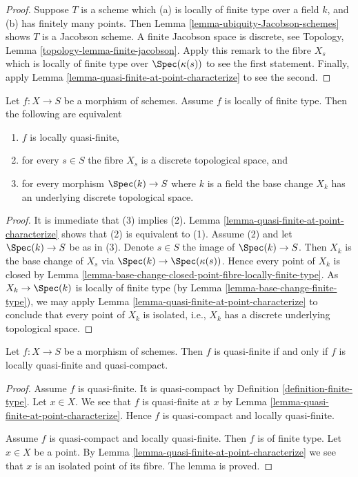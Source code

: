 \begin{proof}
Suppose $T$ is a scheme which (a) is locally of finite type
over a field $k$, and (b) has finitely many points. Then
Lemma \ref{lemma-ubiquity-Jacobson-schemes} shows $T$ is a
Jacobson scheme. A finite Jacobson space is discrete, see
Topology, Lemma \ref{topology-lemma-finite-jacobson}.
Apply this remark to the fibre $X_s$ which is locally of finite type over
$\Spec(\kappa(s))$ to see the first statement. Finally, apply
Lemma \ref{lemma-quasi-finite-at-point-characterize} to see the second.
\end{proof}

\begin{lemma}
\label{lemma-locally-quasi-finite-fibres}
Let $f : X \to S$ be a morphism of schemes.
Assume $f$ is locally of finite type.
Then the following are equivalent
\begin{enumerate}
\item $f$ is locally quasi-finite,
\item for every $s \in S$ the fibre $X_s$ is a discrete topological space, and
\item for every morphism $\Spec(k) \to S$ where $k$ is a field
the base change $X_k$ has an underlying discrete topological space.
\end{enumerate}
\end{lemma}

\begin{proof}
It is immediate that (3) implies (2).
Lemma \ref{lemma-quasi-finite-at-point-characterize}
shows that (2) is equivalent to (1).
Assume (2) and let $\Spec(k) \to S$ be as in (3).
Denote $s \in S$ the image  of $\Spec(k) \to S$.
Then $X_k$ is the base change of $X_s$ via
$\Spec(k) \to \Spec(\kappa(s))$. Hence every
point of $X_k$ is closed by
Lemma \ref{lemma-base-change-closed-point-fibre-locally-finite-type}.
As $X_k \to \Spec(k)$ is locally of finite type (by
Lemma \ref{lemma-base-change-finite-type}),
we may apply
Lemma \ref{lemma-quasi-finite-at-point-characterize}
to conclude that every point of $X_k$ is isolated, i.e., $X_k$ has
a discrete underlying topological space.
\end{proof}

\begin{lemma}
\label{lemma-quasi-finite-locally-quasi-compact}
Let $f : X \to S$ be a morphism of schemes.
Then $f$ is quasi-finite if and only if $f$ is
locally quasi-finite and quasi-compact.
\end{lemma}

\begin{proof}
Assume $f$ is quasi-finite. It is quasi-compact by Definition
\ref{definition-finite-type}. Let $x \in X$.
We see that $f$ is quasi-finite at $x$ by
Lemma \ref{lemma-quasi-finite-at-point-characterize}.
Hence $f$ is quasi-compact and locally quasi-finite.

\medskip\noindent
Assume $f$ is quasi-compact and locally quasi-finite.
Then $f$ is of finite type. Let $x \in X$ be a point.
By Lemma \ref{lemma-quasi-finite-at-point-characterize}
we see that $x$ is an isolated point of its fibre.
The lemma is proved.
\end{proof}

